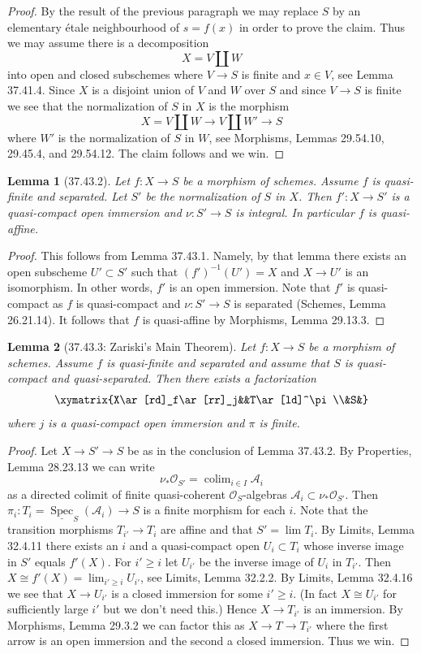 \documentclass[UTF8,11pt]{ctexart}
\newtheorem*{lemma}{Lemma}
\theoremstyle{definition}
\DeclareMathOperator{\Spec}{Spec}
\begin{document}
\begin{proof}
By the result of the previous paragraph we may replace $S$ by an elementary étale neighbourhood of $s=f(x)$ in order to prove the claim. Thus we may assume there is a decomposition
\[X=V\amalg W\]
into open and closed subschemes where $V\to S$ is finite and $x\in V$, see Lemma 37.41.4. Since $X$ is a disjoint union of $V$ and $W$ over $S$ and since $V\to S$ is finite we see that the normalization of $S$ in $X$ is the morphism
\[X=V\amalg W\longrightarrow V\amalg W'\longrightarrow S\]
where $W'$ is the normalization of $S$ in $W$, see Morphisms, Lemmas 29.54.10, 29.45.4, and 29.54.12. The claim follows and we win.
\end{proof}

\begin{lemma}[37.43.2]
Let $f:X\to S$ be a morphism of schemes. Assume $f$ is quasi-finite and separated. Let $S'$ be the normalization of $S$ in $X$. Then $f':X\to S'$ is a quasi-compact open immersion and $\nu:S'\to S$ is integral. In particular $f$ is quasi-affine.
\end{lemma}
\begin{proof}
This follows from Lemma 37.43.1. Namely, by that lemma there exists an open subscheme $U'\subset S'$ such that $(f')^{-1}(U')=X$ and $X\to U'$ is an isomorphism. In other words, $f'$ is an open immersion. Note that $f'$ is quasi-compact as $f$ is quasi-compact and $\nu:S'\to S$ is separated (Schemes, Lemma 26.21.14). It follows that $f$ is quasi-affine by Morphisms, Lemma 29.13.3.
\end{proof}

\begin{lemma}[37.43.3: Zariski's Main Theorem]
Let $f:X\to S$ be a morphism of schemes. Assume $f$ is quasi-finite and separated and assume that $S$ is quasi-compact and quasi-separated. Then there exists a factorization
\[
\xymatrix{X\ar[rd]_f\ar[rr]_j&&T\ar[ld]^\pi\\&S&}
\]
where $j$ is a quasi-compact open immersion and $\pi$ is finite.
\end{lemma}
\begin{proof}
Let $X\to S'\to S$ be as in the conclusion of Lemma 37.43.2. By Properties, Lemma 28.23.13 we can write
\[
\nu_*\mathcal O_{S'}=\mathop{\mathrm{colim}}_{i\in I}\mathcal A_i
\]
as a directed colimit of finite quasi-coherent $\mathcal O_S$-algebras $\mathcal A_i\subset\nu_*\mathcal O_{S'}$. Then $\pi_i:T_i=\underline{\Spec}_S(\mathcal A_i)\to S$ is a finite morphism for each $i$. Note that the transition morphisms $T_{i'}\to T_i$ are affine and that $S'=\mathop{\mathrm{lim}}T_i$. By Limits, Lemma 32.4.11 there exists an $i$ and a quasi-compact open $U_i\subset T_i$ whose inverse image in $S'$ equals $f'(X)$. For $i'\geq i$ let $U_{i'}$ be the inverse image of $U_i$ in $T_{i'}$. Then $X\cong f'(X)=\mathop{\mathrm{lim}}_{i'\geq i}U_{i'}$, see Limits, Lemma 32.2.2. By Limits, Lemma 32.4.16 we see that $X\to U_{i'}$ is a closed immersion for some $i'\geq i$. (In fact $X\cong U_{i'}$ for sufficiently large $i'$ but we don't need this.) Hence $X\to T_{i'}$ is an immersion. By Morphisms, Lemma 29.3.2 we can factor this as $X\to T\to T_{i'}$ where the first arrow is an open immersion and the second a closed immersion. Thus we win.
\end{proof}
\end{document}
